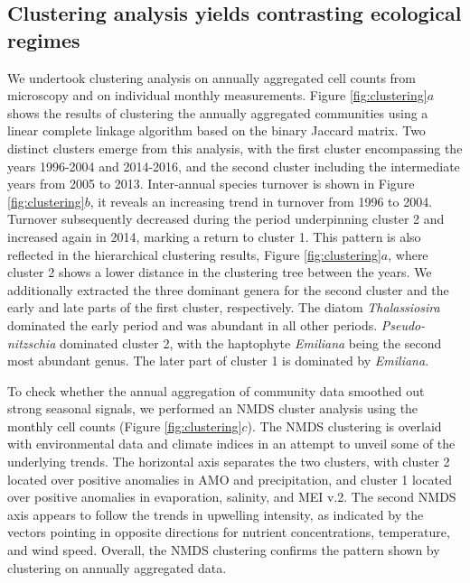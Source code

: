 \documentclass[draft]{agujournal2019}
\begin{document}
\subsection{Clustering analysis yields contrasting ecological regimes}
    We undertook clustering analysis on annually aggregated cell counts from microscopy and on individual monthly measurements. Figure \ref{fig:clustering}$a$ shows the results of clustering the annually aggregated communities using a linear complete linkage algorithm based on the binary Jaccard matrix. Two distinct clusters emerge from this analysis, with the first cluster encompassing the years 1996-2004 and 2014-2016, and the second cluster including the intermediate years from 2005 to 2013. 
    Inter-annual species turnover is shown in Figure \ref{fig:clustering}$b$, it reveals an increasing trend in turnover from 1996 to 2004. Turnover subsequently decreased during the period underpinning cluster 2 and increased again in 2014, marking a return to cluster 1. This pattern is also reflected in the hierarchical clustering results, Figure \ref{fig:clustering}$a$, where cluster 2 shows a lower distance in the clustering tree between the years. We additionally extracted the three dominant genera for the second cluster and the early and late parts of the first cluster, respectively. The diatom \textit{Thalassiosira} dominated the early period and was abundant in all other periods. \textit{Pseudo-nitzschia} dominated cluster 2, with the haptophyte \textit{Emiliana} being the second most abundant genus. The later part of cluster 1 is dominated by \textit{Emiliana}. 
    
    To check whether the annual aggregation of community data smoothed out strong seasonal signals, we performed an NMDS cluster analysis using the monthly cell counts (Figure \ref{fig:clustering}$c$). The NMDS clustering is overlaid with environmental data and climate indices in an attempt to unveil some of the underlying trends. The horizontal axis separates the two clusters, with cluster 2 located over positive anomalies in AMO and precipitation, and cluster 1 located over positive anomalies in evaporation, salinity, and MEI v.2. The second NMDS axis appears to follow the trends in upwelling intensity, as indicated by the vectors pointing in opposite directions for nutrient concentrations, temperature, and wind speed. Overall, the NMDS clustering confirms the pattern shown by clustering on annually aggregated data. 
    
\end{document}
